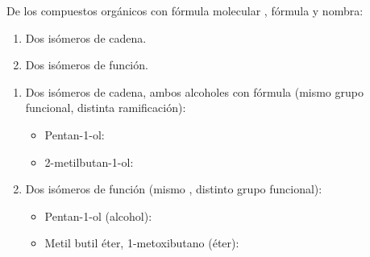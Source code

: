 \begin{exerciseEVAU}
    De los compuestos orgánicos con fórmula molecular , fórmula y nombra:
    \begin{enumerate}[label=\letraminuscula]
        \item Dos isómeros de cadena.
        \item Dos isómeros de función.
    \end{enumerate}

    \begin{solu}


        \begin{enumerate}[label=\letraminuscula]
            \item Dos isómeros de cadena, ambos alcoholes con fórmula  (mismo grupo funcional, distinta ramificación):
            \begin{itemize}
                \item Pentan-1-ol: 
                \item 2-metilbutan-1-ol: 
            \end{itemize}

            \item Dos isómeros de función (mismo , distinto grupo funcional):
            \begin{itemize}
                \item Pentan-1-ol (alcohol): 
                \item Metil butil éter, 1-metoxibutano (éter): 
            \end{itemize}
        \end{enumerate}
    \end{solu}
\end{exerciseEVAU}

